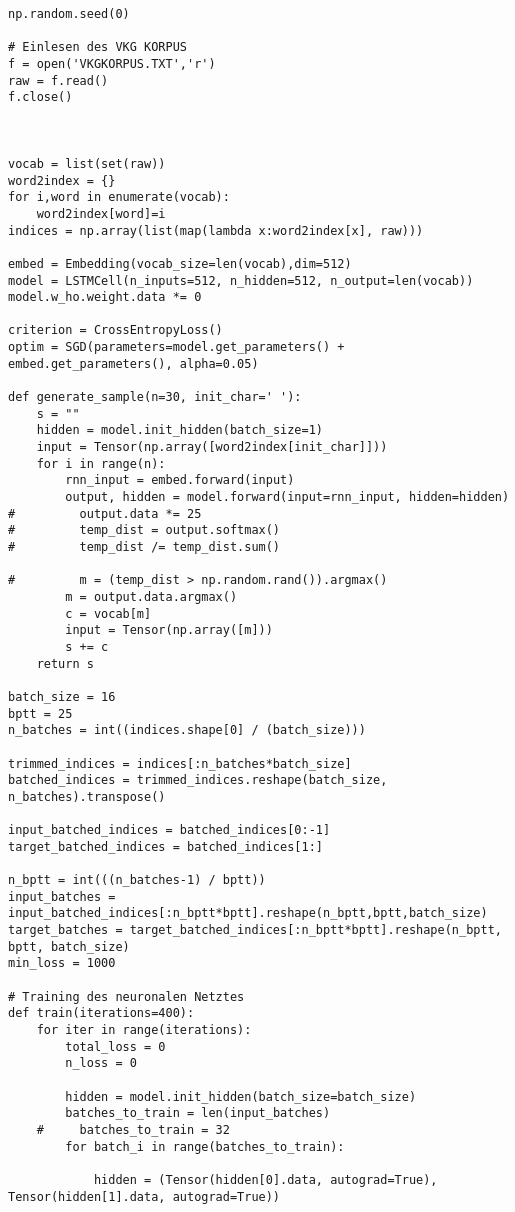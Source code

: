 \documentclass[12pt]{article}
\begin{document}
\begin{verbatim}
np.random.seed(0)

# Einlesen des VKG KORPUS
f = open('VKGKORPUS.TXT','r')
raw = f.read()
f.close()



vocab = list(set(raw))
word2index = {}
for i,word in enumerate(vocab):
    word2index[word]=i
indices = np.array(list(map(lambda x:word2index[x], raw)))

embed = Embedding(vocab_size=len(vocab),dim=512)
model = LSTMCell(n_inputs=512, n_hidden=512, n_output=len(vocab))
model.w_ho.weight.data *= 0

criterion = CrossEntropyLoss()
optim = SGD(parameters=model.get_parameters() + embed.get_parameters(), alpha=0.05)

def generate_sample(n=30, init_char=' '):
    s = ""
    hidden = model.init_hidden(batch_size=1)
    input = Tensor(np.array([word2index[init_char]]))
    for i in range(n):
        rnn_input = embed.forward(input)
        output, hidden = model.forward(input=rnn_input, hidden=hidden)
#         output.data *= 25
#         temp_dist = output.softmax()
#         temp_dist /= temp_dist.sum()

#         m = (temp_dist > np.random.rand()).argmax()
        m = output.data.argmax()
        c = vocab[m]
        input = Tensor(np.array([m]))
        s += c
    return s

batch_size = 16
bptt = 25
n_batches = int((indices.shape[0] / (batch_size)))

trimmed_indices = indices[:n_batches*batch_size]
batched_indices = trimmed_indices.reshape(batch_size, n_batches).transpose()

input_batched_indices = batched_indices[0:-1]
target_batched_indices = batched_indices[1:]

n_bptt = int(((n_batches-1) / bptt))
input_batches = input_batched_indices[:n_bptt*bptt].reshape(n_bptt,bptt,batch_size)
target_batches = target_batched_indices[:n_bptt*bptt].reshape(n_bptt, bptt, batch_size)
min_loss = 1000

# Training des neuronalen Netztes
def train(iterations=400):
    for iter in range(iterations):
        total_loss = 0
        n_loss = 0

        hidden = model.init_hidden(batch_size=batch_size)
        batches_to_train = len(input_batches)
    #     batches_to_train = 32
        for batch_i in range(batches_to_train):

            hidden = (Tensor(hidden[0].data, autograd=True), Tensor(hidden[1].data, autograd=True))


\end{verbatim}
\end{document}
